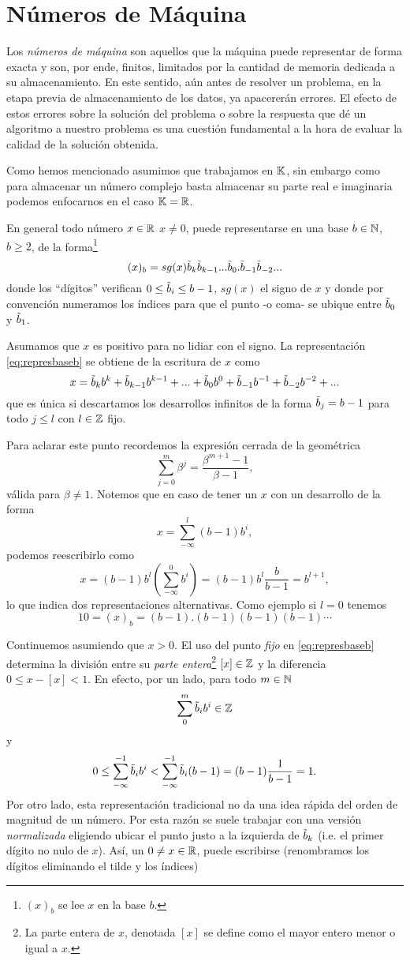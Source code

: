 \section{Números de Máquina}
Los \emph{números de máquina} son aquellos que la máquina puede representar de forma exacta y son, por ende, finitos, limitados por la cantidad de memoria dedicada a su almacenamiento. En este sentido, aún antes de resolver un problema, en la etapa previa de almacenamiento de los datos, ya apacererán errores. El efecto de estos errores sobre la solución del problema o sobre la respuesta que dé un algoritmo a nuestro problema es una cuestión fundamental a la hora de evaluar la calidad de la solución obtenida.


Como hemos mencionado asumimos que trabajamos en $\mathbb K$, sin embargo como para almacenar un número complejo basta almacenar su parte real e imaginaria podemos enfocarnos en el caso $\mathbb K=\mathbb R$.

En general todo número  $x\in \mathbb R$ $x\neq 0$, puede representarse en una base $b\in\mathbb N$, $b\ge 2$, de la forma\footnote{$(x)_b$ se lee $x$ en la base $b$.}
\begin{equation}
 \label{eq:represbaseb}
(x)_b=sg(x)\tilde b_k\tilde b_{k-1}...\tilde b_0.\tilde b_{-1}\tilde b_{-2}...
 \end{equation}
donde los ``dígitos'' verifican $0\le \tilde b_i\le b-1$, $sg(x)$ el signo de $x$ y donde por convención numeramos los índices para que el punto -o coma- se ubique entre $\tilde b_0$ y $\tilde b_1$.

Asumamos que $x$ es positivo para no lidiar con el signo. La representación \eqref{eq:represbaseb} se obtiene de la escritura de $x$ como
$$
x=\tilde b_kb^k+\tilde b_{k-1}b^{k-1}+...+\tilde b_0b^0+\tilde b_{-1}b^{-1}+\tilde b_{-2}b^{-2}+...
$$
 que es única si  descartamos los desarrollos infinitos de la forma $\tilde b_j=b-1$ para todo $j\le l$ con $l\in \mathbb Z$ fijo.

 Para aclarar este punto recordemos la expresión  cerrada de la geométrica
$$
\sum_{j=0}^m\beta^j=\frac{\beta^{m+1}-1}{\beta -1},
$$
 válida para $\beta\neq 1$. Notemos que  en caso de tener un $x$ con un desarrollo de la forma
$$
x=\sum_{-\infty}^l(b-1)b^i,
$$
podemos reescribirlo como
$$
x=(b-1)b^{l}
\left(\sum_{-\infty}^0b^i\right)=(b-1)b^l\frac{b}{b-1}=b^{l+1},
$$
lo que indica dos  representaciones alternativas. Como ejemplo si  $l=0$ tenemos
$$
10=(x)_b=(b-1).(b-1)(b-1)(b-1)\cdots
$$

Continuemos asumiendo que $x>0$. El uso del punto \emph{fijo} en  \eqref{eq:represbaseb}  determina la división entre su \emph{parte entera}\footnote{La parte entera de $x$, denotada $[x]$ se define como el mayor entero menor o igual a $x$.}  $[x]\in \mathbb Z$ y la diferencia $0\le x-[x]<1$. En efecto, por un lado, para todo $m\in \mathbb N$
$$\sum_{0}^m\tilde b_i b^i\in \mathbb Z$$
y
$$
0\le \sum_{-\infty}^{-1}\tilde b_ib^{i}<\sum_{-\infty}^{-1}\tilde b_i(b-1)=(b-1)\frac{1}{b-1}=1.
$$
Por otro lado, esta representación tradicional no da una idea rápida del orden de magnitud
de un número. Por esta razón se suele trabajar con una versión \emph{normalizada}  eligiendo ubicar el punto justo a la izquierda de $\tilde b_k$ (i.e. el primer dígito no nulo de $x$). Así, un $0\neq x\in \mathbb R$, puede escribirse (renombramos los dígitos eliminando el tilde y los índices)

